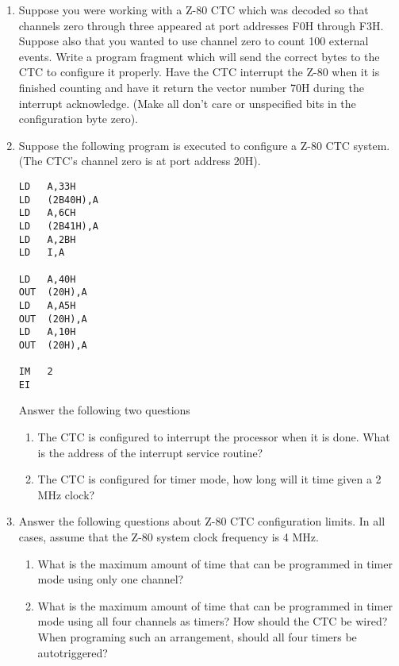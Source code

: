 \begin{enumerate}

\item Suppose you were working with a Z-80 CTC which was decoded so that
channels zero through three appeared at port addresses F0H through F3H.
Suppose also that you wanted to use channel zero to count 100 external
events. Write a program fragment which will send the correct bytes to the
CTC to configure it properly. Have the CTC interrupt the Z-80 when it is
finished counting and have it return the vector number 70H during the
interrupt acknowledge. (Make all don't care or unspecified bits in the
configuration byte zero).

\item Suppose the following program is executed to configure a Z-80 CTC
system. (The CTC's channel zero is at port address 20H).

\begin{verbatim}
LD   A,33H
LD   (2B40H),A
LD   A,6CH
LD   (2B41H),A
LD   A,2BH
LD   I,A

LD   A,40H
OUT  (20H),A
LD   A,A5H
OUT  (20H),A
LD   A,10H
OUT  (20H),A

IM   2
EI
\end{verbatim}

Answer the following two questions

\begin{enumerate}

\item The CTC is configured to interrupt the processor when it is done. What is
the address of the interrupt service routine?

\item The CTC is configured for timer mode, how long will it time given a 2 MHz
clock?

\end{enumerate}

\item Answer the following questions about Z-80 CTC configuration
limits. In all cases, assume that the Z-80 system clock
frequency is 4 MHz.

\begin{enumerate}

\item What is the maximum amount of time that can be
programmed in timer mode using only one channel?

\item What is the maximum amount of time that can be
programmed in timer mode using all four channels as timers? How should the
CTC be wired? When programing such an arrangement, should all four timers
be autotriggered?


\end{enumerate}
\end{enumerate}
